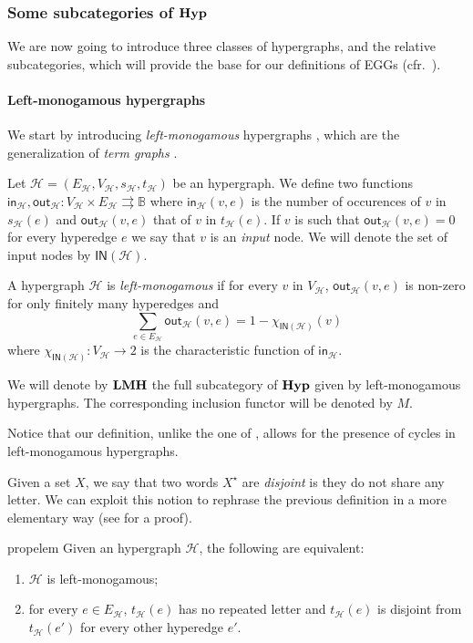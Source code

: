 \documentclass[3p]{elsarticle}
\newcommand{\ind}[1]{\mathsf{in}_{\mathcal{#1}}}
\newcommand{\ino}[1]{\mathsf{IN}({\mathcal{#1}})}
\newcommand{\outd}[1]{\mathsf{out}_{\mathcal{#1}}}
\newcommand{\catname}[1]{\textbf{\textup{#1}}}
\newcommand{\lmo}{\catname{LMH}}
\newcommand{\hyp}{\catname{Hyp}}
\theoremstyle{remark}
\theoremstyle{definition}
\begin{document}
\subsubsection{Some  subcategories of $\hyp$}

We are now going to introduce three classes of hypergraphs, and the relative subcategories, which will provide the base for our definitions of EGGs  (cfr.~). 


\paragraph{Left-monogamous hypergraphs}\label{par:lm}
We start by introducing \emph{left-monogamous} hypergraphs \cite{milosavljevic2023string,fritz2023free}, which are the generalization of \emph{term graphs} \cite{corradini2005term,Plu:TGR-ENTCS}.  

\begin{defi}
	Let $\mathcal{H}=(E_{\mathcal{H}}, V_{\mathcal{H}}, s_{\mathcal{H}}, t_{\mathcal{H}})$ be an hypergraph. We define two functions $\ind{H}, \outd{H}\colon V_{\mathcal{H}}\times E_{\mathcal{H}}\rightrightarrows \mathbb{B}$ where $\ind{H}(v,e)$ is the number of occurences of $v$ in $s_{\mathcal{H}}(e)$ and $\outd{H}(v,e)$ that of $v$ in $t_{\mathcal{H}}(e)$. If $v$ is such that $\outd{H}(v,e)=0$ for every hyperedge $e$ we say that $v$ is an \emph{input} node. We will denote the set of input nodes by $\ino{H}$.
	
	A hypergraph $\mathcal{H}$ is \emph{left-monogamous} if for every $v$ in $V_\mathcal{H}$, $\outd{H}(v,e)$ is non-zero for only finitely many hyperedges and
	\[\sum_{e\in E_{\mathcal{H}}} \outd{H}(v, e) = 1 - \chi_{\ino{H}}(v)\]
	where $\chi_{\ino{H}}\colon V_{\mathcal{H}}\to 2$ is the characteristic function of $\ind{H}$.
	
	We will denote by $\lmo$ the full subcategory of $\hyp$ given by left-monogamous hypergraphs. The corresponding inclusion functor will be denoted by $M$.
\end{defi}


\begin{rem}Notice that our definition, unlike the one of \cite{fritz2023free}, allows for the presence of cycles in left-monogamous hypergraphs.
\end{rem}

Given a set $X$, we say that two words $X^\star$ are \emph{disjoint} is they do not share any letter. We can exploit this notion to rephrase the previous definition in a more elementary way (see  for a proof).
\begin{restatable}{prop}{elem}\label{rem:elem} Given an hypergraph $\mathcal{H}$, the following are equivalent:
	\begin{enumerate}
		\item $\mathcal{H}$ is left-monogamous;
		\item for every $e\in E_{\mathcal{H}}$, $t_{\mathcal{H}}(e)$ has no repeated letter and $t_{\mathcal{H}}(e)$ is disjoint from $t_{\mathcal{H}}(e')$ for every other hyperedge $e'$.
	\end{enumerate}
\end{restatable} 
\end{document}
